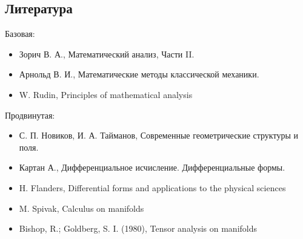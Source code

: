 \documentclass{article}
\begin{document}
\subsection*{Литература}
Базовая:
\begin{itemize}
    \item Зорич В. А., Математический анализ, Части II.
    \item Арнольд В. И., Математические методы классической механики. 
    \item  W. Rudin, Principles of mathematical analysis
\end{itemize}
Продвинутая:
\begin{itemize}
    \item С. П. Новиков, И. А. Тайманов, Современные геометрические структуры и поля.
    \item Картан А., Дифференциальное исчисление. Дифференциальные формы.
    \item H. Flanders, Differential forms and applications to the physical sciences
    \item M. Spivak, Calculus on manifolds
    \item Bishop, R.; Goldberg, S. I. (1980), Tensor analysis on manifolds
\end{itemize}
\newpage
{}
\end{document}
